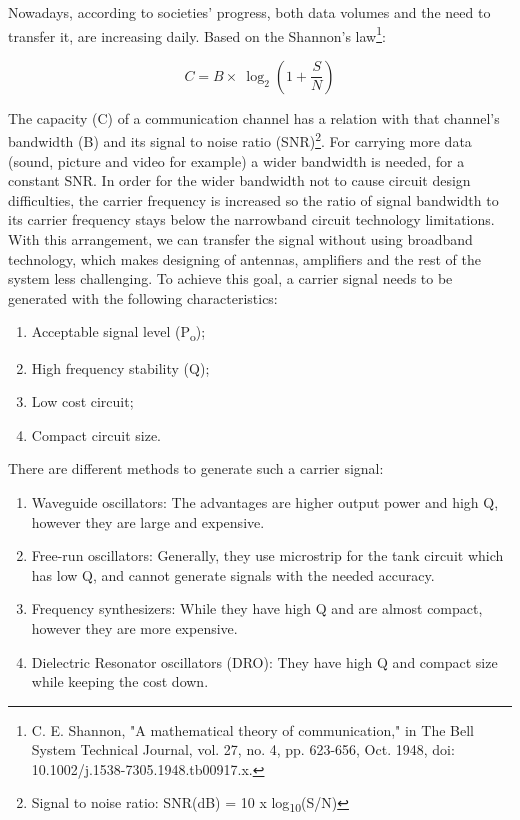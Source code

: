 Nowadays, according to societies' progress, both data volumes and the
need to transfer it, are increasing daily. Based on the Shannon's
law\footnote{C. E. Shannon, "A mathematical theory of communication," in
  The Bell System Technical Journal, vol. 27, no. 4, pp. 623-656, Oct.
  1948, doi: 10.1002/j.1538-7305.1948.tb00917.x.}:

\[C = B \times \ \log_{2}(1 + \frac{S}{N})\]

The capacity (C) of a communication channel has a relation with that
channel's bandwidth (B) and its signal to noise ratio (SNR)\footnote{Signal
  to noise ratio: SNR(dB) = 10 x log\textsubscript{10}(S/N)}. For
carrying more data (sound, picture and video for example) a wider
bandwidth is needed, for a constant SNR. In order for the wider
bandwidth not to cause circuit design difficulties, the carrier
frequency is increased so the ratio of signal bandwidth to its carrier
frequency stays below the narrowband circuit technology limitations.
With this arrangement, we can transfer the signal without using
broadband technology, which makes designing of antennas, amplifiers and
the rest of the system less challenging. To achieve this goal, a carrier
signal needs to be generated with the following characteristics:

\begin{enumerate}
\def\labelenumi{\arabic{enumi}.}
\item
  Acceptable signal level (P\textsubscript{o});
\item
  High frequency stability (Q);
\item
  Low cost circuit;
\item
  Compact circuit size.
\end{enumerate}

There are different methods to generate such a carrier signal:

\begin{enumerate}
\def\labelenumi{\arabic{enumi}.}
\item
  Waveguide oscillators: The advantages are higher output power and high
  Q, however they are large and expensive.
\item
  Free-run oscillators: Generally, they use microstrip for the tank
  circuit which has low Q, and cannot generate signals with the needed
  accuracy.
\item
  Frequency synthesizers: While they have high Q and are almost compact,
  however they are more expensive.
\item
  Dielectric Resonator oscillators (DRO): They have high Q and compact
  size while keeping the cost down.
\end{enumerate}

